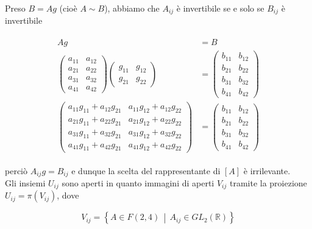 Preso $ B = A g $ (cioè $ A \sim B $), abbiamo che $ A_{ij} $ è invertibile se e solo se $ B_{ij} $ è invertibile

\begin{align}
	\begin{split}
		A g &= B\\
		\begin{pmatrix} a_{11} & a_{12} \\ a_{21} & a_{22} \\ a_{31} & a_{32} \\ a_{41} & a_{42} \end{pmatrix} \begin{pmatrix} g_{11} & g_{12} \\ g_{21} & g_{22} \end{pmatrix} &= \begin{pmatrix} b_{11} & b_{12} \\ b_{21} & b_{22} \\ b_{31} & b_{32} \\ b_{41} & b_{42} \end{pmatrix}\\
		\begin{pmatrix} a_{11} g_{11} + a_{12} g_{21} & a_{11} g_{12} + a_{12} g_{22} \\ a_{21} g_{11} + a_{22} g_{21} & a_{21} g_{12} + a_{22} g_{22} \\ a_{31} g_{11} + a_{32} g_{21} & a_{31} g_{12} + a_{32} g_{22} \\ a_{41} g_{11} + a_{42} g_{21} & a_{41} g_{12} + a_{42} g_{22} \end{pmatrix} &= \begin{pmatrix} b_{11} & b_{12} \\ b_{21} & b_{22} \\ b_{31} & b_{32} \\ b_{41} & b_{42} \end{pmatrix}
	\end{split}
\end{align}

perciò $ A_{ij} g = B_{ij} $ e dunque la scelta del rappresentante di $ [A] $ è irrilevante.\\
Gli insiemi $ U_{ij} $ sono aperti in quanto immagini di aperti $ V_{ij} $ tramite la proiezione $ U_{ij} = \pi(V_{ij}) $, dove

\begin{equation}
	V_{ij} = \left\{ A \in F(2,4) \, \middle| \, A_{ij} \in GL_{2}(\mathbb{R}) \right\}
\end{equation}

